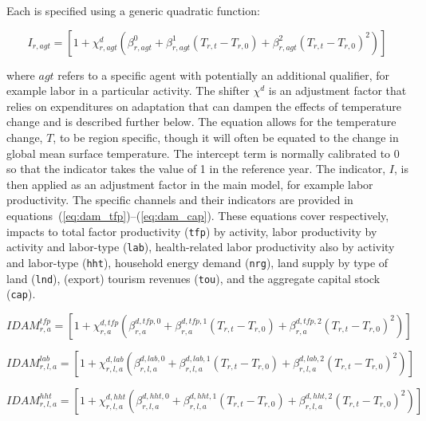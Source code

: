 \documentclass[11pt,letterpaper]{report}
\begin{document}
\noindent Each is specified using a generic quadratic function:

\[
I_{r,\mathit{agt}} = \left[1 + \chi^d_{r,\mathit{agt}}
\left(\beta^0_{r,\mathit{agt}} +  \beta^1_{r,\mathit{agt}} \left(T_{r,t} - T_{r,0}\right)
+  \beta^2_{r,\mathit{agt}} \left(T_{r,t} - T_{r,0}\right)^2  \right)
\right]
\]

\noindent where $\mathit{agt}$ refers to a specific agent with
potentially an additional qualifier, for example labor in a
particular activity. The shifter $\chi^d$ is an
adjustment factor that relies on expenditures on
adaptation that can dampen the effects of temperature
change and is described further below. The equation
allows for the temperature change, $T$, to be
region specific, though it will often be equated to
the change in global mean surface temperature.
The intercept term is normally calibrated to 0 so
that the indicator takes the value of 1 in the reference year.
The indicator, $I$, is then applied as
an adjustment factor in the main model, for example labor
productivity. The specific channels and their indicators are
provided in equations~(\ref{eq:dam_tfp})--(\ref{eq:dam_cap}).
These equations cover respectively, impacts to total factor
productivity (\texttt{tfp}) by activity,
labor productivity by activity and labor-type (\texttt{lab}),
health-related labor productivity also by activity
and labor-type (\texttt{hht}), household energy demand (\texttt{nrg}),
land supply by type of land (\texttt{lnd}),
(export) tourism revenues (\texttt{tou}), and
the aggregate capital stock (\texttt{cap}).

\begin{equation}
\label{eq:dam_tfp}
\mathit{IDAM}^{\mathit{tfp}}_{r,a} =
\left[1 + \chi^{d,\mathit{tfp}}_{r,\mathit{a}}
\left(
\beta^{d,\mathit{tfp},0}_{r,\mathit{a}} +  \beta^{d,\mathit{tfp},1}_{r,\mathit{a}}
\left(T_{r,t} - T_{r,0}\right) +
\beta^{d,\mathit{tfp},2}_{r,\mathit{a}}
\left(T_{r,t} - T_{r,0}\right)^2
\right)
\right]
\end{equation}

\begin{equation}
\label{eq:dam_lab}
\mathit{IDAM}^{\mathit{lab}}_{r,l,a} =
\left[1 + \chi^{d,\mathit{lab}}_{r,l,\mathit{a}}
\left(
\beta^{d,\mathit{lab},0}_{r,l,\mathit{a}} +  \beta^{d,\mathit{lab},1}_{r,l,\mathit{a}}
\left(T_{r,t} - T_{r,0}\right) +
\beta^{d,\mathit{lab},2}_{r,l,\mathit{a}}
\left(T_{r,t} - T_{r,0}\right)^2
\right)
\right]
\end{equation}

\begin{equation}
\label{eq:dam_hht}
\mathit{IDAM}^{\mathit{hht}}_{r,l,a} =
\left[1 + \chi^{d,\mathit{hht}}_{r,l,\mathit{a}}
\left(
\beta^{d,\mathit{hht},0}_{r,l,\mathit{a}} +  \beta^{d,\mathit{hht},1}_{r,l,\mathit{a}}
\left(T_{r,t} - T_{r,0}\right) +
\beta^{d,\mathit{hht},2}_{r,l,\mathit{a}}
\left(T_{r,t} - T_{r,0}\right)^2
\right)
\right]
\end{equation}
\end{document}

